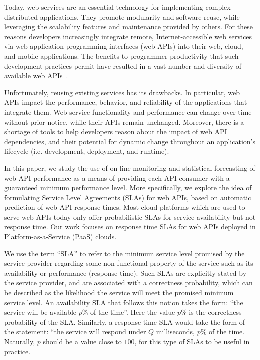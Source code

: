 Today, web services are an essential technology for implementing
complex distributed applications. They promote modularity and software reuse,
while leveraging the scalability features and maintenance 
provided by others. For these reasons developers increasingly integrate remote, 
Internet-accessible web services via web application programming interfaces (web APIs)
into their web, cloud, and mobile applications.  
The benefits to programmer productivity that such development practices
permit have resulted in a vast number and diversity of available web APIs~\cite{pweb}.

Unfortunately, reusing existing services has its drawbacks. In particular, 
web APIs impact the performance, behavior, and reliability of the applications
that integrate them.  Web service functionality and performance can change over time 
without prior notice, while their APIs remain unchanged.
Moreover, there is a shortage of tools to help developers 
reason about the impact of web API dependencies, and their potential for
dynamic change throughout an application's 
lifecycle (i.e. development, deployment, and runtime).  

In this paper, we study the use of on-line monitoring and statistical
forecasting of web API performance as a means of providing each API
consumer with a guaranteed minimum performance level.
More specifically, we explore the idea of formulating Service Level Agreements (SLAs)
for web APIs, based on automatic prediction of web API response times.
Most cloud platforms which are used to serve web APIs today only offer probabilistic
SLAs for service availability but not response time. 
Our work focuses on response time SLAs for web APIs deployed
in Platform-as-a-Service (PaaS) clouds.

We use the term ``SLA'' to refer to the minimum service level promised by the
service provider regarding some non-functional property of the service such as
its availability or performance (response time). Such SLAs are explicitly
stated by the service provider, and are associated with a correctness probability,
which can be described as the likelihood the service will meet the promised
minimum service level. An availability SLA that follows this notion
takes the form: ``the service will be available $p\%$ of the time''.
Here the value $p\%$ is the correctness probability of the SLA. Similarly, a
response time SLA would take the form of the statement: ``the service will respond 
under $Q$ milliseconds, $p\%$ of the time. Naturally, $p$ should be a value close
to $100$, for this type of SLAs to be useful in practice. 

